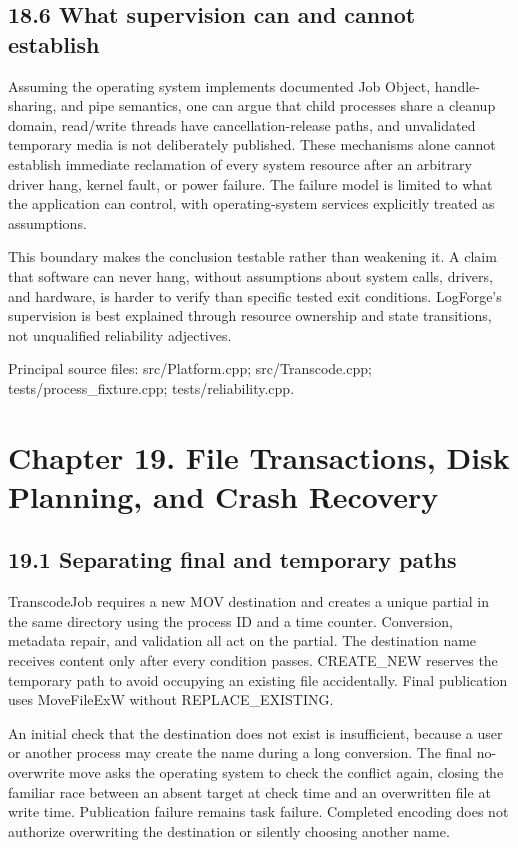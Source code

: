 \documentclass[11pt,a4paper,openany]{book}
\begin{document}
\section*{18.6 What supervision can and cannot establish}
Assuming the operating system implements documented Job Object, handle-sharing, and pipe semantics, one can argue that child processes share a cleanup domain, read/write threads have cancellation-release paths, and unvalidated temporary media is not deliberately published. These mechanisms alone cannot establish immediate reclamation of every system resource after an arbitrary driver hang, kernel fault, or power failure. The failure model is limited to what the application can control, with operating-system services explicitly treated as assumptions.

This boundary makes the conclusion testable rather than weakening it. A claim that software can never hang, without assumptions about system calls, drivers, and hardware, is harder to verify than specific tested exit conditions. LogForge's supervision is best explained through resource ownership and state transitions, not unqualified reliability adjectives.


\par\small Principal source files: src/Platform.cpp; src/Transcode.cpp; tests/process\_fixture.cpp; tests/reliability.cpp.\normalsize

\chapter*{Chapter 19. File Transactions, Disk Planning, and Crash Recovery}

\section*{19.1 Separating final and temporary paths}
TranscodeJob requires a new MOV destination and creates a unique partial in the same directory using the process ID and a time counter. Conversion, metadata repair, and validation all act on the partial. The destination name receives content only after every condition passes. CREATE\_NEW reserves the temporary path to avoid occupying an existing file accidentally. Final publication uses MoveFileExW without REPLACE\_EXISTING.

An initial check that the destination does not exist is insufficient, because a user or another process may create the name during a long conversion. The final no-overwrite move asks the operating system to check the conflict again, closing the familiar race between an absent target at check time and an overwritten file at write time. Publication failure remains task failure. Completed encoding does not authorize overwriting the destination or silently choosing another name.
\end{document}
